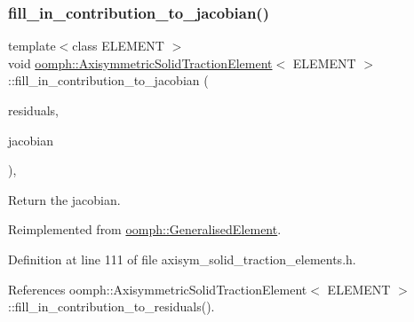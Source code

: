 \subsubsection{\texorpdfstring{fill\+\_\+in\+\_\+contribution\+\_\+to\+\_\+jacobian()}{fill\_in\_contribution\_to\_jacobian()}}
{\footnotesize\ttfamily template$<$class E\+L\+E\+M\+E\+NT $>$ \\
void \hyperlink{classoomph_1_1AxisymmetricSolidTractionElement}{oomph\+::\+Axisymmetric\+Solid\+Traction\+Element}$<$ E\+L\+E\+M\+E\+NT $>$\+::fill\+\_\+in\+\_\+contribution\+\_\+to\+\_\+jacobian (\begin{DoxyParamCaption}\item[{\hyperlink{classoomph_1_1Vector}{Vector}$<$ double $>$ \&}]{residuals,  }\item[{\hyperlink{classoomph_1_1DenseMatrix}{Dense\+Matrix}$<$ double $>$ \&}]{jacobian }\end{DoxyParamCaption})\hspace{0.3cm}{\ttfamily [inline]}, {\ttfamily [virtual]}}



Return the jacobian. 



Reimplemented from \hyperlink{classoomph_1_1GeneralisedElement_a6ae09fc0d68e4309ac1b03583d252845}{oomph\+::\+Generalised\+Element}.



Definition at line 111 of file axisym\+\_\+solid\+\_\+traction\+\_\+elements.\+h.



References oomph\+::\+Axisymmetric\+Solid\+Traction\+Element$<$ E\+L\+E\+M\+E\+N\+T $>$\+::fill\+\_\+in\+\_\+contribution\+\_\+to\+\_\+residuals().

\mbox{\label{classoomph_1_1AxisymmetricSolidTractionElement_a4cd8a5664e8a62263e376dd9eb9ea985}} 
